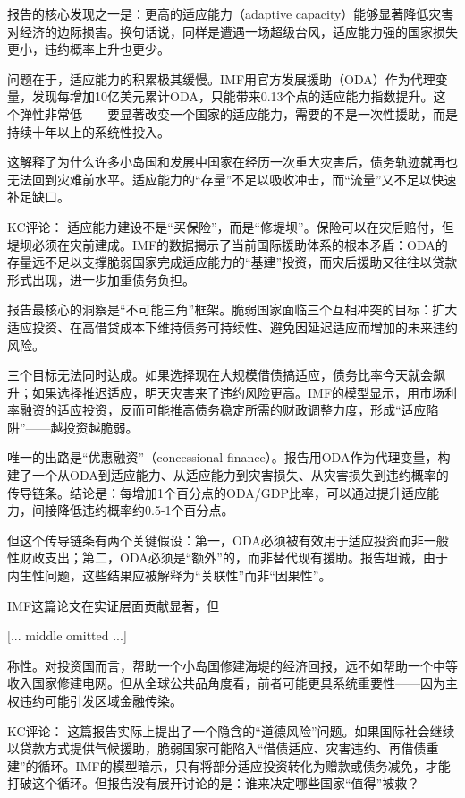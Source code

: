 \documentclass[11pt]{ctexart}
\begin{document}
报告的核心发现之一是：更高的适应能力（adaptive capacity）能够显著降低灾害对经济的边际损害。换句话说，同样是遭遇一场超级台风，适应能力强的国家损失更小，违约概率上升也更少。

问题在于，适应能力的积累极其缓慢。IMF用官方发展援助（ODA）作为代理变量，发现每增加10亿美元累计ODA，只能带来0.13个点的适应能力指数提升。这个弹性非常低——要显著改变一个国家的适应能力，需要的不是一次性援助，而是持续十年以上的系统性投入。

这解释了为什么许多小岛国和发展中国家在经历一次重大灾害后，债务轨迹就再也无法回到灾难前水平。适应能力的“存量”不足以吸收冲击，而“流量”又不足以快速补足缺口。

KC评论： 适应能力建设不是“买保险”，而是“修堤坝”。保险可以在灾后赔付，但堤坝必须在灾前建成。IMF的数据揭示了当前国际援助体系的根本矛盾：ODA的存量远不足以支撑脆弱国家完成适应能力的“基建”投资，而灾后援助又往往以贷款形式出现，进一步加重债务负担。

报告最核心的洞察是“不可能三角”框架。脆弱国家面临三个互相冲突的目标：扩大适应投资、在高借贷成本下维持债务可持续性、避免因延迟适应而增加的未来违约风险。

三个目标无法同时达成。如果选择现在大规模借债搞适应，债务比率今天就会飙升；如果选择推迟适应，明天灾害来了违约风险更高。IMF的模型显示，用市场利率融资的适应投资，反而可能推高债务稳定所需的财政调整力度，形成“适应陷阱”——越投资越脆弱。

唯一的出路是“优惠融资”（concessional finance）。报告用ODA作为代理变量，构建了一个从ODA到适应能力、从适应能力到灾害损失、从灾害损失到违约概率的传导链条。结论是：每增加1个百分点的ODA/GDP比率，可以通过提升适应能力，间接降低违约概率约0.5-1个百分点。

但这个传导链条有两个关键假设：第一，ODA必须被有效用于适应投资而非一般性财政支出；第二，ODA必须是“额外”的，而非替代现有援助。报告坦诚，由于内生性问题，这些结果应被解释为“关联性”而非“因果性”。

IMF这篇论文在实证层面贡献显著，但

[... middle omitted ...]

称性。对投资国而言，帮助一个小岛国修建海堤的经济回报，远不如帮助一个中等收入国家修建电网。但从全球公共品角度看，前者可能更具系统重要性——因为主权违约可能引发区域金融传染。

KC评论： 这篇报告实际上提出了一个隐含的“道德风险”问题。如果国际社会继续以贷款方式提供气候援助，脆弱国家可能陷入“借债适应、灾害违约、再借债重建”的循环。IMF的模型暗示，只有将部分适应投资转化为赠款或债务减免，才能打破这个循环。但报告没有展开讨论的是：谁来决定哪些国家“值得”被救？
\end{document}
